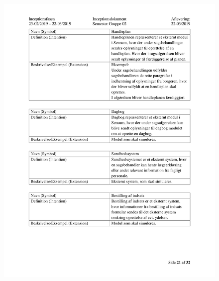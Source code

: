 \begin{figure}[hb]
  \includegraphics[scale = 0.33]{./PNG/Inceptions/Gruppe02+InceptionsDokument-22.jpg} 
\end{figure}

